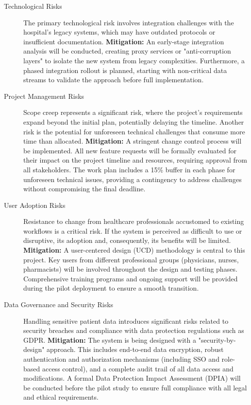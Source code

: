 \begin{description}
    \item[Technological Risks] The primary technological risk involves integration challenges with the hospital's legacy systems, which may have outdated protocols or insufficient documentation.
    \textbf{Mitigation:} An early-stage integration analysis will be conducted, creating proxy services or "anti-corruption layers" to isolate the new system from legacy complexities. Furthermore, a phased integration rollout is planned, starting with non-critical data streams to validate the approach before full implementation.

    \item[Project Management Risks] Scope creep represents a significant risk, where the project's requirements expand beyond the initial plan, potentially delaying the timeline. Another risk is the potential for unforeseen technical challenges that consume more time than allocated.
    \textbf{Mitigation:} A stringent change control process will be implemented. All new feature requests will be formally evaluated for their impact on the project timeline and resources, requiring approval from all stakeholders. The work plan includes a 15\% buffer in each phase for unforeseen technical issues, providing a contingency to address challenges without compromising the final deadline.

    \item[User Adoption Risks] Resistance to change from healthcare professionals accustomed to existing workflows is a critical risk. If the system is perceived as difficult to use or disruptive, its adoption and, consequently, its benefits will be limited.
    \textbf{Mitigation:} A user-centered design (UCD) methodology is central to this project. Key users from different professional groups (physicians, nurses, pharmacists) will be involved throughout the design and testing phases. Comprehensive training programs and ongoing support will be provided during the pilot deployment to ensure a smooth transition.

    \item[Data Governance and Security Risks] Handling sensitive patient data introduces significant risks related to security breaches and compliance with data protection regulations such as GDPR.
    \textbf{Mitigation:} The system is being designed with a "security-by-design" approach. This includes end-to-end data encryption, robust authentication and authorization mechanisms (including SSO and role-based access control), and a complete audit trail of all data access and modifications. A formal Data Protection Impact Assessment (DPIA) will be conducted before the pilot study to ensure full compliance with all legal and ethical requirements.
\end{description} 